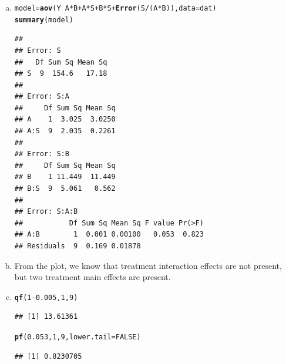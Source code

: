 \documentclass{article}\usepackage[]{graphicx}\usepackage[]{color}
\makeatletter
\newcommand{\hlnum}[1]{\textcolor[rgb]{0.686,0.059,0.569}{#1}}%
\newcommand{\hlopt}[1]{\textcolor[rgb]{0,0,0}{#1}}%
\newcommand{\hlstd}[1]{\textcolor[rgb]{0.345,0.345,0.345}{#1}}%
\newcommand{\hlkwb}[1]{\textcolor[rgb]{0.69,0.353,0.396}{#1}}%
\newcommand{\hlkwc}[1]{\textcolor[rgb]{0.333,0.667,0.333}{#1}}%
\newcommand{\hlkwd}[1]{\textcolor[rgb]{0.737,0.353,0.396}{\textbf{#1}}}%
\newenvironment{kframe}{%
 \def\at@end@of@kframe{}%
 \ifinner\ifhmode%
  \def\at@end@of@kframe{\end{minipage}}%
  \begin{minipage}{\columnwidth}%
 \fi\fi%
 \def\FrameCommand##1{\hskip\@totalleftmargin \hskip-\fboxsep
 \colorbox{shadecolor}{##1}\hskip-\fboxsep
     \hskip-\linewidth \hskip-\@totalleftmargin \hskip\columnwidth}%
 \MakeFramed {\advance\hsize-\width
   \@totalleftmargin\z@ \linewidth\hsize
   \@setminipage}}%
 {\par\unskip\endMakeFramed%
 \at@end@of@kframe}
\newenvironment{knitrout}{}{} %
\makeatother
\begin{document}
\begin{enumerate}[(a)]

\item

\begin{knitrout}
\color{fgcolor}\begin{kframe}
\begin{alltt}
  \hlstd{model} \hlkwb{=} \hlkwd{aov}\hlstd{(Y}\hlopt{~} \hlstd{A}\hlopt{*}\hlstd{B}\hlopt{+}\hlstd{A}\hlopt{*}\hlstd{S}\hlopt{+}\hlstd{B}\hlopt{*}\hlstd{S}\hlopt{+} \hlkwd{Error}\hlstd{(S}\hlopt{/}\hlstd{(A}\hlopt{*}\hlstd{B)),} \hlkwc{data} \hlstd{= dat)}
  \hlkwd{summary}\hlstd{(model)}
\end{alltt}
\begin{verbatim}
## 
## Error: S
##   Df Sum Sq Mean Sq
## S  9  154.6   17.18
## 
## Error: S:A
##     Df Sum Sq Mean Sq
## A    1  3.025  3.0250
## A:S  9  2.035  0.2261
## 
## Error: S:B
##     Df Sum Sq Mean Sq
## B    1 11.449  11.449
## B:S  9  5.061   0.562
## 
## Error: S:A:B
##           Df Sum Sq Mean Sq F value Pr(>F)
## A:B        1  0.001 0.00100   0.053  0.823
## Residuals  9  0.169 0.01878
\end{verbatim}
\end{kframe}
\end{knitrout}

\item



\qquad From the plot, we know that treatment interaction effects are not present, but two treatment main effects are present.

\item

\begin{knitrout}
\color{fgcolor}\begin{kframe}
\begin{alltt}
  \hlkwd{qf}\hlstd{(}\hlnum{1}\hlopt{-}\hlnum{0.005}\hlstd{,} \hlnum{1}\hlstd{,} \hlnum{9}\hlstd{)}
\end{alltt}
\begin{verbatim}
## [1] 13.61361
\end{verbatim}
\begin{alltt}
  \hlkwd{pf}\hlstd{(}\hlnum{0.053}\hlstd{,} \hlnum{1}\hlstd{,} \hlnum{9}\hlstd{,} \hlkwc{lower.tail} \hlstd{=} \hlnum{FALSE}\hlstd{)}
\end{alltt}
\begin{verbatim}
## [1] 0.8230705
\end{verbatim}
\end{kframe}
\end{knitrout}


\end{enumerate}
\end{document}
